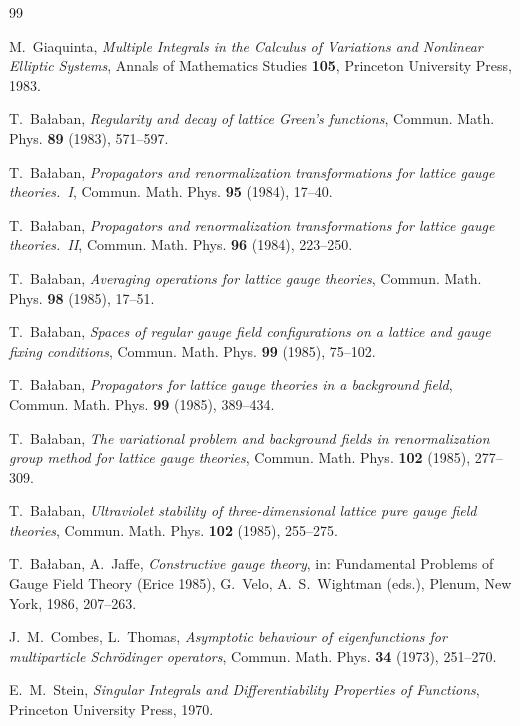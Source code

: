 \begin{thebibliography}{99}

M.~Giaquinta, \emph{Multiple Integrals in the Calculus of Variations and Nonlinear Elliptic Systems}, Annals of Mathematics Studies \textbf{105}, Princeton University Press, 1983.

T.~Ba\l aban, \emph{Regularity and decay of lattice Green's functions}, Commun. Math. Phys. \textbf{89} (1983), 571--597.

T.~Ba\l aban, \emph{Propagators and renormalization transformations for lattice gauge theories.~I}, Commun. Math. Phys. \textbf{95} (1984), 17--40.

T.~Ba\l aban, \emph{Propagators and renormalization transformations for lattice gauge theories.~II}, Commun. Math. Phys. \textbf{96} (1984), 223--250.

T.~Ba\l aban, \emph{Averaging operations for lattice gauge theories}, Commun. Math. Phys. \textbf{98} (1985), 17--51.

T.~Ba\l aban, \emph{Spaces of regular gauge field configurations on a lattice and gauge fixing conditions}, Commun. Math. Phys. \textbf{99} (1985), 75--102.

T.~Ba\l aban, \emph{Propagators for lattice gauge theories in a background field}, Commun. Math. Phys. \textbf{99} (1985), 389--434.

T.~Ba\l aban, \emph{The variational problem and background fields in renormalization group method for lattice gauge theories}, Commun. Math. Phys. \textbf{102} (1985), 277--309.

T.~Ba\l aban, \emph{Ultraviolet stability of three-dimensional lattice pure gauge field theories}, Commun. Math. Phys. \textbf{102} (1985), 255--275.

T.~Ba\l aban, A.~Jaffe, \emph{Constructive gauge theory}, in: Fundamental Problems of Gauge Field Theory (Erice 1985), G.~Velo, A.~S.~Wightman (eds.), Plenum, New York, 1986, 207--263.

J.~M.~Combes, L.~Thomas, \emph{Asymptotic behaviour of eigenfunctions for multiparticle Schr\"odinger operators}, Commun. Math. Phys. \textbf{34} (1973), 251--270.

E.~M.~Stein, \emph{Singular Integrals and Differentiability Properties of Functions}, Princeton University Press, 1970.


\end{thebibliography}
